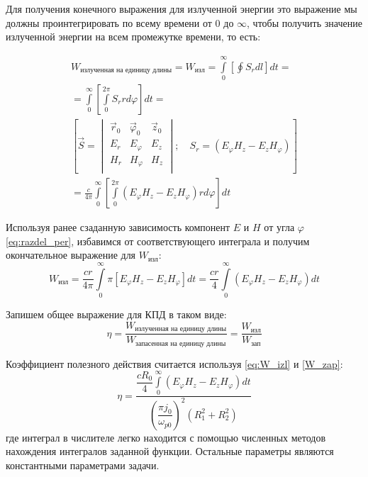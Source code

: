 \documentclass[a4paper]{article}
\begin{document}
Для получения конечного выражения для излученной энергии это выражение мы должны проинтегрировать по всему времени от $0$ до $\infty$, чтобы получить значение излученной энергии на всем промежутке времени, то есть:

\begin{multline}
	W_{\text{излученная на единицу длины}}=W_{\text{изл}}=\int\limits_{0}^{\infty}\left[\oint S_{r}dl\right]dt=\\
	=\int\limits_{0}^{\infty}\left[\int\limits_{0}^{2\pi} S_{r}rd\varphi\right]dt=\\
	\left[
	\vec{S}=\begin{vmatrix}
		\vec{r}_{0}& \vec{\varphi}_{0}& \vec{z}_{0}\\
		E_{r}& E_{\varphi}& E_{z}\\
		H_{r}& H_{\varphi}& H_{z}\\
	\end{vmatrix};\quad S_{r}=\left(E_{\varphi}H_{z}-E_{z}H_{\varphi}\right)\right]\\
	=\frac{c}{4\pi}\int\limits_{0}^{\infty}\left[\int\limits_{0}^{2\pi}\left(E_{\varphi}H_{z}-E_{z}H_{\varphi}\right)rd\varphi\right]dt
	\label{eq:W_izl}
\end{multline}

Используя ранее сзаданную зависимость компонент $E$ и $H$ от угла $\varphi$ \eqref{eq:razdel_per}, избавимся от соответствующего интеграла и получим окончательное выражение для $W_{\text{изл}}$:
\begin{equation}
	W_{\text{изл}}=\frac{cr}{4\pi}\int\limits_{0}^{\infty}\pi\left[E_{\varphi}H_{z}-E_{z}H_{\varphi}\right]dt=\frac{cr}{4}\int\limits_{0}^{\infty}(E_{\varphi}H_{z}-E_{z}H_{\varphi})dt	
\end{equation}

Запишем общее выражение для КПД в таком виде:
\begin{equation}
	\eta =\frac{W_{\text{излученная на единицу длины}}}{W_{\text{запасенная на единицу длины}}}=\frac{W_\text{изл}}{W_\text{зап}}
	\label{eq:kpd3}
\end{equation}

Коэффициент полезного действия считается используя \eqref{eq:W_izl} и \eqref{W_zap}:
\begin{equation}
	\eta=\dfrac{\dfrac{cR_{0}}{4}\int\limits_{0}^{\infty}(E_{\varphi}H_{z}-E_{z}H_{\varphi})dt}{\left(\dfrac{\pi j_{0}}{\omega_{p 0}}\right)^{2}\left(R_{1}^{2}+R_{2}^{2}\right)}
	\label{eq:kpd_last}
\end{equation}
 где интеграл в числителе легко находится с помощью численных методов нахождения интегралов заданной функции. Остальные параметры являются константными параметрами задачи.
\newpage
\end{document}
